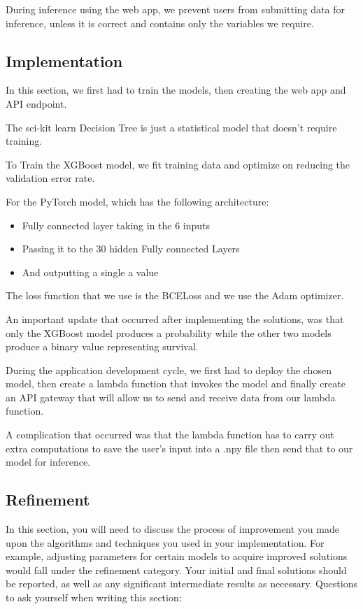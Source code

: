\documentclass{article}
\begin{document}
During inference using the web app, we prevent users from submitting data for inference,
unless it is correct and contains only the variables we require.

\subsection{Implementation}\label{implementation}

In this section, we first had to train the models, then creating the web app and API endpoint.

The sci-kit learn Decision Tree is just a statistical model that doesn't require training.

To Train the XGBoost model, we fit training data and optimize on 
reducing the validation error rate.

For the PyTorch model, which has the following architecture:
\begin{itemize}
    \item Fully connected layer taking in the 6 inputs
    \item Passing it to the 30 hidden Fully connected Layers
    \item And outputting a single a value
\end{itemize}
The loss function that we use is the BCELoss and we use the Adam optimizer.

An important update that occurred after implementing the solutions, was
that only the XGBoost model produces a probability while the other two models 
produce a binary value representing survival.

During the application development cycle, we first had to deploy the chosen model,
then create a lambda function that invokes the model and finally create an API gateway
that will allow us to send and receive data from our lambda function.

A complication that occurred was that the lambda function has to carry out 
extra computations to save the user's input into a .npy file then send that 
to our model for inference.

\subsection{Refinement}\label{refinement}

In this section, you will need to discuss the process of improvement you
made upon the algorithms and techniques you used in your implementation.
For example, adjusting parameters for certain models to acquire improved
solutions would fall under the refinement category. Your initial and
final solutions should be reported, as well as any significant
intermediate results as necessary. Questions to ask yourself when
writing this section:
\end{document}
